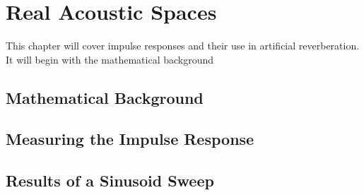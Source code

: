 \chapter{Real Acoustic Spaces}
This chapter will cover impulse responses and their use in artificial reverberation. It will begin with the mathematical background

\section{Mathematical Background}
\section{Measuring the Impulse Response}
\section{Results of a Sinusoid Sweep}
